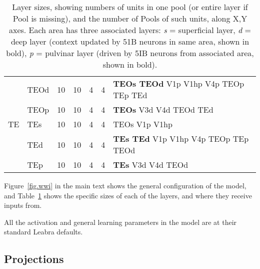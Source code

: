 \begin{table}
\begin{tabular}{llrrlll}
   & TEOd & 10 & 10 & 4 & 4 & {\bf TEOs TEOd} V1p V1hp V4p TEOp TEp TEd \\
   & TEOp & 10 & 10 & 4 & 4 & {\bf TEOs} V3d V4d TEOd TEd \\
TE & TEs & 10 & 10 & 4 & 4 & TEOs V1p V1hp \\
   & TEd & 10 & 10 & 4 & 4 & {\bf TEs TEd} V1p V1hp V4p TEOp TEp TEOd \\
   & TEp & 10 & 10 & 4 & 4 & {\bf TEs} V3d V4d TEOd \\
\hline
\end{tabular}
\caption{\footnotesize Layer sizes, showing numbers of units in one pool (or entire layer if Pool is missing), and the number of Pools of such units, along X,Y axes.  Each area has three associated layers: {\em s} = superficial layer, {\em d} = deep layer (context updated by 51B neurons in same area, shown in bold), {\em p} = pulvinar layer (driven by 5IB neurons from associated area, shown in bold).}
\label{tab.layer_sizes}
\end{table}

Figure~\ref{fig.wwi} in the main text shows the general configuration of the model, and Table~\ref{tab.layer_sizes} shows the specific sizes of each of the layers, and where they receive inputs from. 

All the activation and general learning parameters in the model are at their standard Leabra defaults.

\subsection{Projections}

